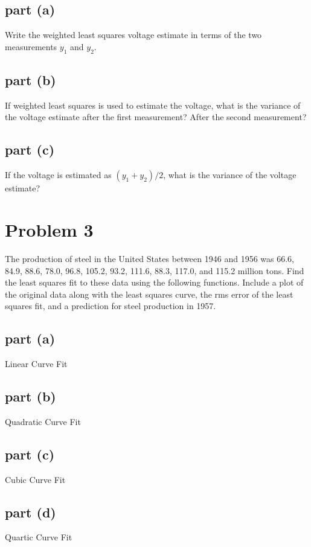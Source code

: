 \documentclass[11pt]{article}
\begin{document}
\subsection*{part (a)}
Write the weighted least squares voltage estimate in terms of the two measurements $y_1$ and $y_2$.

\subsection*{part (b)}
If weighted least squares is used to estimate the voltage, what is the variance of the voltage estimate after the first measurement? After the second measurement?

\subsection*{part (c)}
If the voltage is estimated as $(y_1+y_2)/2$, what is the variance of the voltage estimate?

\section*{Problem 3}
The production of steel in the United States between 1946 and 1956 was 66.6, 84.9, 88.6, 78.0, 96.8, 105.2, 93.2, 111.6, 88.3, 117.0, and 115.2 million tons. Find the least squares fit to these data using the following functions. Include a plot of the original data along with the least squares curve, the rms error of the least squares fit, and a prediction for steel production in 1957.

\subsection*{part (a)}
Linear Curve Fit

\subsection*{part (b)}
Quadratic Curve Fit

\subsection*{part (c)}
Cubic Curve Fit

\subsection*{part (d)}
Quartic Curve Fit
\end{document}
